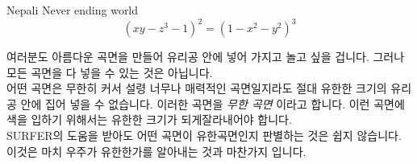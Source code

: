 \begin{surferPage}{Nepali}
Never ending world \\
\smallskip
\[(x y - z^3 -1)^2= (1 - x^2	- y^2)^3\]

\singlespacing
여러분도 아름다운 곡면을 만들어 유리공 안에 넣어 가지고 놀고 싶을 겁니다. 그러나 모든 곡면을 다 넣을 수 있는  것은 아닙니다.
\\
\singlespacing
어떤 곡면은 무한히 커서 설령 너무나 매력적인 곡면일지라도 절대 유한한 크기의 유리공 안에 집어 넣을 수 없습니다. 이러한 곡면을 \textit{무한 곡면} 이라고 합니다. 이런 곡면에 색을 입하기 위해서는 유한한 크기가 되게잘라내어야 합니다. 
\\
\singlespacing
SURFER의 도움을 받아도 어떤 곡면이 유한곡면인지 판별하는 것은 쉽지 않습니다. 이것은 마치 우주가 유한한가를 알아내는 것과 마찬가지 입니다.
\end{surferPage}
